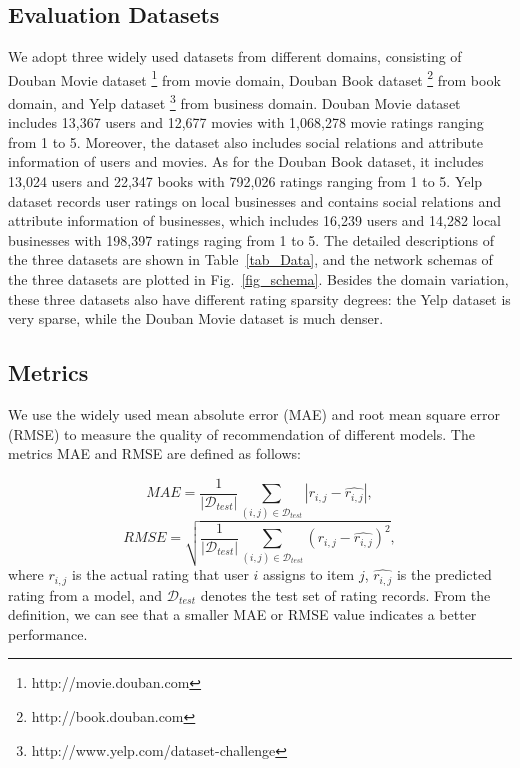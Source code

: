 \subsection{Evaluation Datasets}
We adopt three widely used datasets from different domains, consisting of Douban Movie dataset \footnote{http://movie.douban.com} from movie domain, Douban Book dataset \footnote{http://book.douban.com} from book domain, and Yelp dataset \footnote{http://www.yelp.com/dataset-challenge} from business domain. Douban Movie dataset includes 13,367 users and 12,677 movies with 1,068,278 movie ratings ranging from 1 to 5. Moreover, the dataset also includes social relations and attribute information of users and movies. As for the Douban Book dataset, it includes 13,024 users and 22,347 books with 792,026 ratings ranging from 1 to 5. Yelp dataset records user ratings on local businesses and contains social relations and attribute information of businesses, which includes 16,239 users and 14,282 local businesses with 198,397 ratings raging from 1 to 5. The detailed descriptions of the three datasets are shown in Table~\ref{tab_Data}, and the network schemas of the three datasets are plotted in Fig.~\ref{fig_schema}. Besides the domain variation, these three datasets also have different rating sparsity degrees: the Yelp dataset is very sparse, while the Douban Movie dataset is much denser.



\subsection{Metrics}
We use the widely used mean absolute error (MAE) and root mean square error (RMSE) to measure the quality of recommendation of different models. The metrics MAE and RMSE are defined as follows:

\begin{equation}
MAE = \frac{1}{|\mathcal{D}_{test}|}\sum_{(i, j) \in \mathcal{D}_{test}}{|r_{i,j} - \widehat{r_{i,j}}|},
\end{equation}
\begin{equation}
RMSE = \sqrt{\frac{1}{|\mathcal{D}_{test}|}\sum_{(i, j) \in \mathcal{D}_{test}}{(r_{i,j} - \widehat{r_{i,j}})^2}},
\end{equation}
where $r_{i,j}$ is the actual rating that user $i$ assigns to item $j$, $\widehat{r_{i,j}}$ is the predicted rating from a model, and $\mathcal{D}_{test}$ denotes the test set of rating records. From the definition, we can see that a smaller MAE or RMSE value indicates a better performance.

